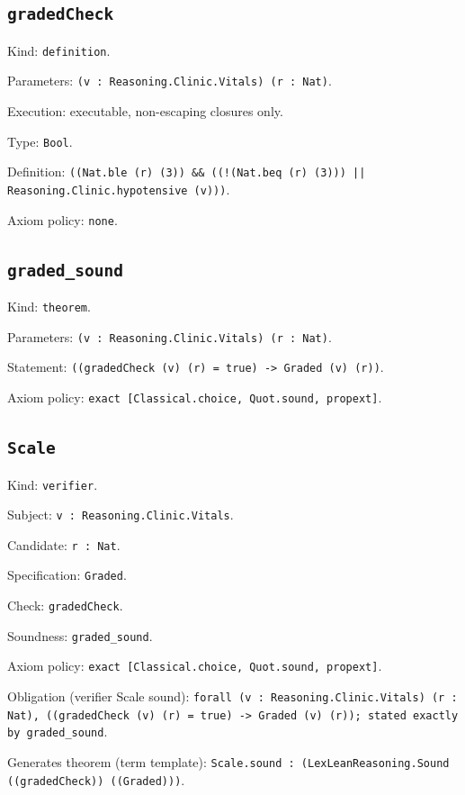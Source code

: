 \documentclass[11pt]{article}
\begin{document}
\subsection*{\texttt{gradedCheck}}
\noindent Kind: \texttt{definition}.\par
\noindent Parameters: \texttt{(v : Reasoning.Clinic.Vitals) (r : Nat)}.\par
\noindent Execution: executable, non-escaping closures only.\par
\noindent Type: \texttt{Bool}.\par
\noindent Definition: \texttt{((Nat.ble (r) (3)) \&\& ((!(Nat.beq (r) (3))) || Reasoning.Clinic.hypotensive (v)))}.\par
\noindent Axiom policy: \texttt{none}.\par
\subsection*{\texttt{graded\_sound}}
\noindent Kind: \texttt{theorem}.\par
\noindent Parameters: \texttt{(v : Reasoning.Clinic.Vitals) (r : Nat)}.\par
\noindent Statement: \texttt{((gradedCheck (v) (r) = true) -> Graded (v) (r))}.\par
\noindent Axiom policy: \texttt{exact [Classical.choice, Quot.sound, propext]}.\par
\subsection*{\texttt{Scale}}
\noindent Kind: \texttt{verifier}.\par
\noindent Subject: \texttt{v : Reasoning.Clinic.Vitals}.\par
\noindent Candidate: \texttt{r : Nat}.\par
\noindent Specification: \texttt{Graded}.\par
\noindent Check: \texttt{gradedCheck}.\par
\noindent Soundness: \texttt{graded\_sound}.\par
\noindent Axiom policy: \texttt{exact [Classical.choice, Quot.sound, propext]}.\par
\noindent Obligation (verifier Scale sound): \texttt{forall (v : Reasoning.Clinic.Vitals) (r : Nat), ((gradedCheck (v) (r) = true) -> Graded (v) (r)); stated exactly by graded\_sound}.\par
\noindent Generates theorem (term template): \texttt{Scale.sound : (LexLeanReasoning.Sound ((gradedCheck)) ((Graded)))}.\par
\end{document}
